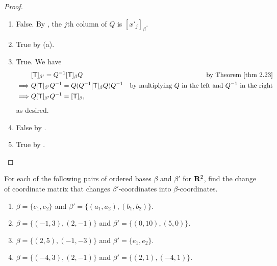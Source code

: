 \begin{proof} \ 

\begin{enumerate}
\item False. By , the \(j\)th column of \(Q\) is \([x'_j]_{\beta}\).
\item True by (a).
\item True.
    We have
    \begin{align*}
                 & [\T]_{\beta'} = Q^{-1}[\T]_{\beta}Q & \text{by \THM{2.23}} \\
        \implies & Q [\T]_{\beta'} Q^{-1} = Q (Q^{-1} [\T]_{\beta} Q) Q^{-1} & \text{by multiplying \(Q\) in the left and \(Q^{-1}\) in the right} \\
        \implies & Q [\T]_{\beta'} Q^{-1} = [\T]_{\beta},
    \end{align*}
    as desired.
\item False by .
\item True by .
\end{enumerate}
\end{proof}

\begin{exercise} \label{exercise 2.5.2}
For each of the following pairs of ordered bases \(\beta\) and \(\beta'\) for \(\mathbf{R}^2\), find the change of coordinate matrix that changes \(\beta'\)-coordinates into \(\beta\)-coordinates.
\begin{enumerate}
\item \(\beta = \{ e_1, e_2 \}\) and \(\beta' = \{ (a_1, a_2), (b_1, b_2) \}\).
\item \(\beta = \{ (-1, 3), (2, -1) \}\) and \(\beta' = \{ (0, 10), (5, 0) \}\).
\item \(\beta = \{ (2, 5), (-1, -3) \}\) and \(\beta' = \{ e_1, e_2 \}\).
\item \(\beta = \{ (-4, 3), (2, -1) \}\) and \(\beta' = \{ (2, 1), (-4, 1) \}\).
\end{enumerate}
\end{exercise}

